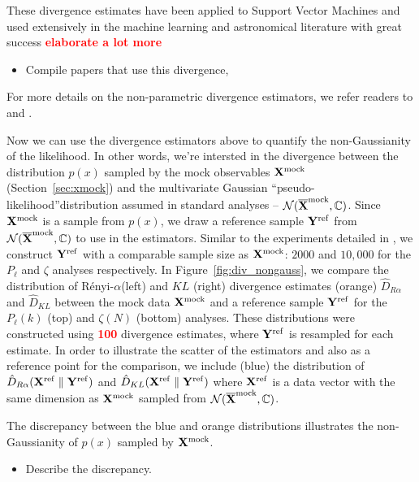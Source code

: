 \documentclass[12pt, letterpaper, preprint]{aastex}
\newcommand{\bitem}{\begin{itemize}}
\newcommand{\eitem}{\end{itemize}}
\newcommand{\todo}[1]{{\bf \textcolor{red}{#1}}}
\newcommand{\Xmock}{{\bf X}^\mathrm{mock}}
\newcommand{\Xref}{{\bf X}^\mathrm{ref}}
\newcommand{\Yref}{{\bf Y}^\mathrm{ref}}
\newcommand{\Ralpha}{R\'enyi-$\alpha$}
\begin{document}
These divergence estimates have been applied to Support Vector Machines and used 
extensively in the machine learning and astronomical literature with great success 
\todo{elaborate a lot more} 
\bitem 
    \item Compile papers that use this divergence, \cite{ntampaka2015, ntampaka2016}
\eitem
For more details on the non-parametric divergence estimators, we refer readers to 
\cite{poczos2012} and \cite{krishnamurthy2014}.

Now we can use the divergence estimators above to quantify the non-Gaussianity 
of the likelihood. In other words, we're intersted in the divergence between
the distribution $p(x)$ sampled by the mock observables $\Xmock$ (Section~\ref{sec:xmock})
and the multivariate Gaussian ``pseudo-likelihood''distribution assumed in 
standard analyses -- $\mathcal{N}(\overline{\bf X}^\mathrm{mock}, \mathbb{C})$. Since
$\Xmock$ is a sample from $p(x)$, we draw a reference sample 
${\bf Y}^\mathrm{ref}$ from $\mathcal{N}(\overline{\bf X}^\mathrm{mock}, \mathbb{C})$ 
to use in the estimators. Similar to the experiments detailed in \cite{poczos2012}, 
we construct ${\bf Y}^\mathrm{ref}$ with a comparable sample size as $\Xmock$: 
$2000$ and $10,000$ for the $P_\ell$ and $\zeta$ analyses respectively. 
In Figure~\ref{fig:div_nongauss}, we compare the distribution of 
\Ralpha (left) and $KL$ (right) divergence estimates (orange)
$\hat{D}_{R\alpha}$ and $\hat{D}_{KL}$
between the mock data ${\bf X}^\mathrm{mock}$ and a reference sample 
${\bf Y}^\mathrm{ref}$ for the $P_\ell(k)$ (top) and $\zeta(N)$ (bottom) analyses.
These distributions were constructed using \todo{100} divergence estimates, 
where $\Yref$ is resampled for each estimate. In order to illustrate the scatter of the estimators and also  
as a reference point for the comparison, we include (blue) 
the distribution of $\hat{D}_{R\alpha}(\Xref \parallel \Yref)$ 
and $\hat{D}_{KL}(\Xref \parallel \Yref)$ where $\Xref$ is a data vector
with the same dimension as $\Xmock$ sampled from $\mathcal{N}(\overline{\bf X}^\mathrm{mock}, \mathbb{C})$.

The discrepancy between the blue and orange distributions illustrates the
non-Gaussianity of $p(x)$ sampled by ${\bf X}^\mathrm{mock}$. 
\bitem 
    \item Describe the discrepancy. 
\eitem
\end{document}
